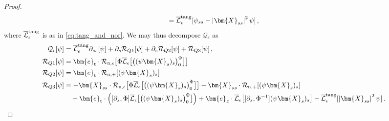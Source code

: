 \documentclass[11pt,reqno]{amsart}
\newcommand{\X}{\bm{X}}
\newcommand{\be}{\bm{e}}
\newcommand{\p}{\partial}
\newcommand{\abs}[1]{\left\lvert #1 \right\rvert}
\newcommand{\mc}[1]{\mathcal{#1}}
\theoremstyle{definition}
\begin{document}
\begin{proof}
\begin{equation}
  = \overline{\mc{L}}_\epsilon^{\rm tang}[\psi_{ss}- \abs{\X_{ss}}^2\psi]\,,
\end{equation}
where $\overline{\mc{L}}_\epsilon^{\rm tang}$ is as in \eqref{eq:tang_and_nor}. We may thus decompose $\mc{Q}_\epsilon$ as 
\begin{equation}
\begin{aligned}
  \mc{Q}_\epsilon[\psi] 
  &= \overline{\mc{L}}_\epsilon^{\rm tang}\p_{ss}[\psi] +\p_s\mc{R}_{Q1}[\psi]
  +\p_s\mc{R}_{Q2}[\psi] +\mc{R}_{Q3}[\psi]\,,\\
  \mc{R}_{Q1}[\psi]&= \be_{\rm t}\cdot\mc{R}_{\rm n,\epsilon}\big[\Phi\overline{\mc{L}}_\epsilon\big[\big((\psi\X_s)_s \big)_0^\Phi\big]\big] \\
  \mc{R}_{Q2}[\psi] &=\be_{\rm t}\cdot\mc{R}_{\rm n,+}[(\psi\X_s)_s]\\
  \mc{R}_{Q3}[\psi]&= - \X_{ss}\cdot\mc{R}_{\rm n,\epsilon}\big[\Phi\overline{\mc{L}}_\epsilon\big[\big((\psi\X_s)_s \big)_0^\Phi\big]\big] 
  -\X_{ss}\cdot\mc{R}_{\rm n,+}[(\psi\X_s)_s]\\
  &\quad+ \be_{\rm t}\cdot\left([\p_s,\Phi]\overline{\mc{L}}_\epsilon\big[\big((\psi\X_s)_s \big)_0^\Phi\big] \right)
  + \be_z\cdot\overline{\mc{L}}_\epsilon\big[[\p_s,\Phi^{-1}](\psi\X_s)_s\big]
  - \overline{\mc{L}}_\epsilon^{\rm tang}[\abs{\X_{ss}}^2\psi]\,.
\end{aligned}
\end{equation}



\end{proof}
\end{document}
